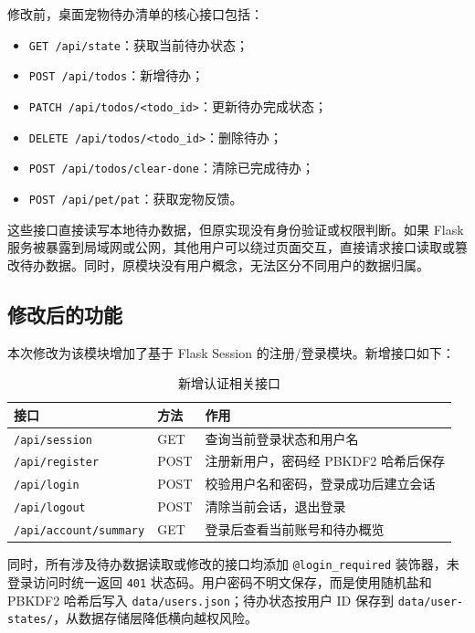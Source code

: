 \documentclass[12pt,a4paper]{ctexart}
\begin{document}
修改前，桌面宠物待办清单的核心接口包括：

\begin{itemize}[leftmargin=2.5em]
    \item \texttt{GET /api/state}：获取当前待办状态；
    \item \texttt{POST /api/todos}：新增待办；
    \item \texttt{PATCH /api/todos/<todo\_id>}：更新待办完成状态；
    \item \texttt{DELETE /api/todos/<todo\_id>}：删除待办；
    \item \texttt{POST /api/todos/clear-done}：清除已完成待办；
    \item \texttt{POST /api/pet/pat}：获取宠物反馈。
\end{itemize}

这些接口直接读写本地待办数据，但原实现没有身份验证或权限判断。如果 Flask 服务被暴露到局域网或公网，其他用户可以绕过页面交互，直接请求接口读取或篡改待办数据。同时，原模块没有用户概念，无法区分不同用户的数据归属。

\subsection{修改后的功能}

本次修改为该模块增加了基于 Flask Session 的注册/登录模块。新增接口如下：

\begin{table}[H]
    \centering
    \caption{新增认证相关接口}
    \begin{tabularx}{\textwidth}{C{4.2cm}C{2.2cm}Y}
        \toprule
        接口 & 方法 & 作用 \\
        \midrule
        \texttt{/api/session} & GET & 查询当前登录状态和用户名 \\
        \texttt{/api/register} & POST & 注册新用户，密码经 PBKDF2 哈希后保存 \\
        \texttt{/api/login} & POST & 校验用户名和密码，登录成功后建立会话 \\
        \texttt{/api/logout} & POST & 清除当前会话，退出登录 \\
        \texttt{/api/account/summary} & GET & 登录后查看当前账号和待办概览 \\
        \bottomrule
    \end{tabularx}
\end{table}

同时，所有涉及待办数据读取或修改的接口均添加 \texttt{@login\_required} 装饰器，未登录访问时统一返回 \texttt{401} 状态码。用户密码不明文保存，而是使用随机盐和 PBKDF2 哈希后写入 \texttt{data/users.json}；待办状态按用户 ID 保存到 \texttt{data/user-states/}，从数据存储层降低横向越权风险。
\end{document}

